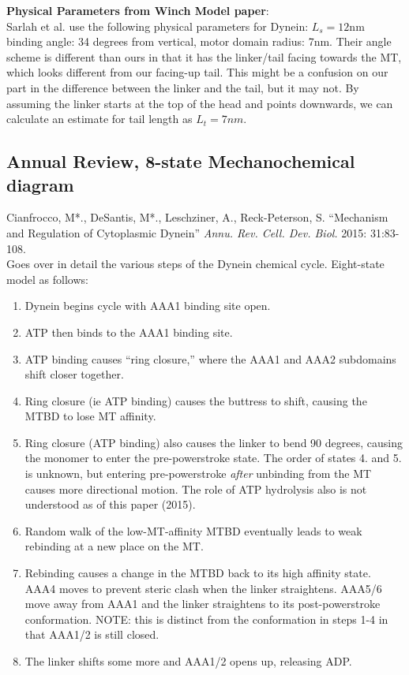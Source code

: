 \documentclass[10pt]{article} %
\begin{document}
\textbf{Physical Parameters from Winch Model paper}:\\
Sarlah et al. use the following physical parameters for Dynein: $L_s = 12$nm binding angle: 34 degrees from vertical, motor
domain radius: 7nm. Their angle scheme is different than ours in that it has the linker/tail facing towards the MT, which looks different
from our facing-up tail. This might be a confusion on our part in the difference between the linker and the tail, but it may not. By assuming the linker starts at the top of the head and points downwards, we can calculate an estimate for tail length as $L_t = 7nm$.

\subsection{Annual Review, 8-state Mechanochemical diagram}
Cianfrocco, M*., DeSantis, M*., Leschziner, A., Reck-Peterson, S. ``Mechanism and Regulation of Cytoplasmic Dynein'' \textit{Annu. Rev. Cell. Dev. Biol.} 2015: 31:83-108.\\

Goes over in detail the various steps of the Dynein chemical cycle. Eight-state model as follows:\\

\begin{enumerate}
\item Dynein begins cycle with AAA1 binding site open.
\item ATP then binds to the AAA1 binding site.
\item ATP binding causes ``ring closure,'' where the AAA1 and AAA2 subdomains shift closer together.
\item Ring closure (ie ATP binding) causes the buttress to shift, causing the MTBD to lose MT affinity.
\item Ring closure (ATP binding) also causes the linker to bend 90 degrees, causing the monomer to enter the pre-powerstroke state. The order of states 4. and 5. is unknown, but entering pre-powerstroke \textit{after} unbinding from the MT causes more directional motion. The role of ATP hydrolysis also is not understood as of this paper (2015).
\item Random walk of the low-MT-affinity MTBD eventually leads to weak rebinding at a new place on the MT.
\item Rebinding causes a change in the MTBD back to its high affinity state. AAA4 moves to prevent steric clash when the linker straightens. AAA5/6 move away from AAA1 and the linker straightens to its post-powerstroke conformation. NOTE: this is distinct from the conformation in steps 1-4 in that AAA1/2 is still closed.
\item The linker shifts some more and AAA1/2 opens up, releasing ADP.
\end{enumerate}
\end{document}
